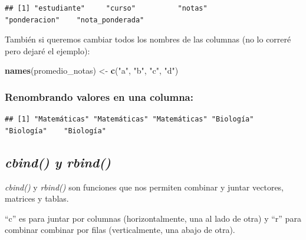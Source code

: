 \documentclass[
]{book}
\newenvironment{Shaded}{\begin{snugshade}}{\end{snugshade}}
\newcommand{\FunctionTok}[1]{\textcolor[rgb]{0.13,0.29,0.53}{\textbf{#1}}}
\newcommand{\NormalTok}[1]{#1}
\newcommand{\OtherTok}[1]{\textcolor[rgb]{0.56,0.35,0.01}{#1}}
\newcommand{\SpecialCharTok}[1]{\textcolor[rgb]{0.81,0.36,0.00}{\textbf{#1}}}
\newcommand{\StringTok}[1]{\textcolor[rgb]{0.31,0.60,0.02}{#1}}
\begin{document}
\begin{verbatim}
## [1] "estudiante"     "curso"          "notas"          "ponderacion"    "nota_ponderada"
\end{verbatim}

También si queremos cambiar todos los nombres de las columnas (no lo correré pero dejaré el ejemplo):

\begin{Shaded}
\begin{Highlighting}[]
\FunctionTok{names}\NormalTok{(promedio\_notas) }\OtherTok{\textless{}{-}} \FunctionTok{c}\NormalTok{(}\StringTok{"a"}\NormalTok{, }\StringTok{"b"}\NormalTok{, }\StringTok{"c"}\NormalTok{, }\StringTok{"d"}\NormalTok{)}
\end{Highlighting}
\end{Shaded}

\subsubsection{Renombrando valores en una columna:}\label{renombrando-valores-en-una-columna}

\begin{Shaded}
\end{Shaded}

\begin{verbatim}
## [1] "Matemáticas" "Matemáticas" "Matemáticas" "Biología"    "Biología"    "Biología"
\end{verbatim}

\subsection{\texorpdfstring{\emph{cbind() y rbind()}}{cbind() y rbind()}}\label{cbind-y-rbind}

\emph{cbind()} y \emph{rbind()} son funciones que nos permiten combinar y juntar vectores, matrices y tablas.

``c'' es para juntar por columnas (horizontalmente, una al lado de otra) y ``r'' para combinar combinar por filas (verticalmente, una abajo de otra).
\end{document}
